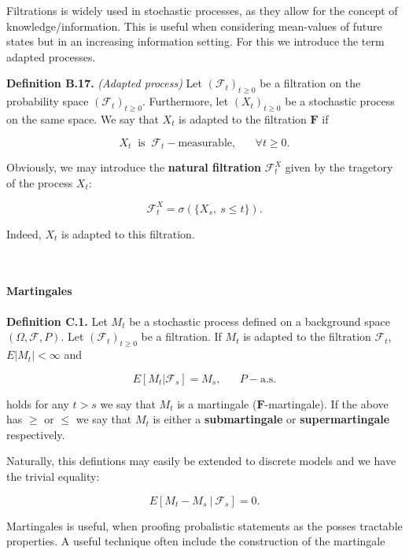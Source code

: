 \documentclass[
]{article}
\begin{document}
Filtrations is widely used in stochastic processes, as they allow for
the concept of knowledge/information. This is useful when considering
mean-values of future states but in an increasing information setting.
For this we introduce the term adapted processes.

\textbf{Definition B.17.} \emph{(Adapted process)} Let
\((\mathcal{F}_t)_{t\ge 0}\) be a filtration on the probability space
\((\mathcal{F}_t)_{t\ge 0}\). Furthermore, let \((X_t)_{t\ge 0}\) be a
stochastic process on the same space. We say that \(X_t\) is adapted to
the filtration \(\mathbf{F}\) if

\[X_t\ \text{ is }\ \mathcal{F}_t-\text{measurable},\hspace{20pt}\forall t\ge 0.\]

Obviously, we may introduce the \textbf{natural filtration}
\(\mathcal{F}^X_t\) given by the tragetory of the process \(X_t\):

\[\mathcal{F}^X_t=\sigma(\{X_s,\ s\le t\}).\]

Indeed, \(X_t\) is adapted to this filtration.

~

\hypertarget{martingales}{%
\paragraph{Martingales}\label{martingales}}

\textbf{Definition C.1.} Let \(M_t\) be a stochastic process defined on
a background space \((\Omega,\mathcal{F},P)\). Let
\((\mathcal{F}_t)_{t\ge 0}\) be a filtration. If \(M_t\) is adapted to
the filtration \(\mathcal{F}_t\), \(E\vert M_t\vert <\infty\) and

\[E[M_t\vert \mathcal{F}_s]=M_s,\hspace{20pt}P-\text{a.s.}\]

holds for any \(t>s\) we say that \(M_t\) is a martingale
(\(\mathbf{F}\)-martingale). If the above has \(\ge\) or \(\le\) we say
that \(M_t\) is either a \textbf{submartingale} or
\textbf{supermartingale} respectively.

Naturally, this defintions may easily be extended to discrete models and
we have the trivial equality:

\[E[M_t-M_s\ \vert\ \mathcal{F}_s]=0.\]

Martingales is useful, when proofing probalistic statements as the
posses tractable properties. A useful technique often include the
construction of the martingale
\end{document}
